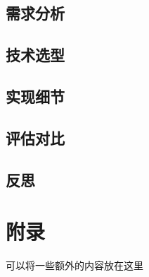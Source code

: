 \documentclass{article}
\theoremstyle{plain}
\theoremstyle{definition}
\theoremstyle{remark}
\begin{document}
\subsection{需求分析}


\subsection{技术选型}


\subsection{实现细节}


\subsection{评估对比}


\subsection{反思}






\newpage
\appendix
\onecolumn
\section{附录}

可以将一些额外的内容放在这里
\end{document}
